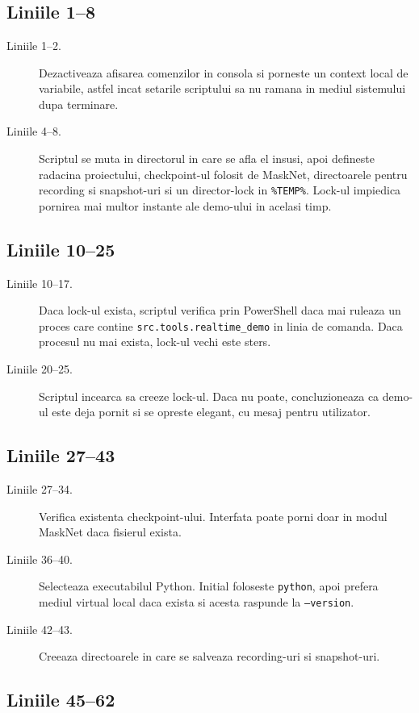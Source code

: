 \documentclass[12pt,a4paper]{report}
\newcommand{\filetitle}[1]{\section*{\texttt{\detokenize{#1}}}}
\newcommand{\cmdchunk}[3]{\subsection*{Liniile #2--#3}}
\begin{document}
\filetitle{launch_realtime_demo.cmd}

\cmdchunk{../launch_realtime_demo.cmd}{1}{8}

\begin{description}
    \item[Liniile 1--2.] Dezactiveaza afisarea comenzilor in consola si porneste
    un context local de variabile, astfel incat setarile scriptului sa nu ramana
    in mediul sistemului dupa terminare.
    \item[Liniile 4--8.] Scriptul se muta in directorul in care se afla el
    insusi, apoi defineste radacina proiectului, checkpoint-ul folosit de
    MaskNet, directoarele pentru recording si snapshot-uri si un director-lock
    in \texttt{\%TEMP\%}. Lock-ul impiedica pornirea mai multor instante ale
    demo-ului in acelasi timp.
\end{description}

\cmdchunk{../launch_realtime_demo.cmd}{10}{25}

\begin{description}
    \item[Liniile 10--17.] Daca lock-ul exista, scriptul verifica prin PowerShell
    daca mai ruleaza un proces care contine \texttt{src.tools.realtime\_demo} in
    linia de comanda. Daca procesul nu mai exista, lock-ul vechi este sters.
    \item[Liniile 20--25.] Scriptul incearca sa creeze lock-ul. Daca nu poate,
    concluzioneaza ca demo-ul este deja pornit si se opreste elegant, cu mesaj
    pentru utilizator.
\end{description}

\cmdchunk{../launch_realtime_demo.cmd}{27}{43}

\begin{description}
    \item[Liniile 27--34.] Verifica existenta checkpoint-ului. Interfata poate
    porni doar in modul MaskNet daca fisierul  exista.
    \item[Liniile 36--40.] Selecteaza executabilul Python. Initial foloseste
    \texttt{python}, apoi prefera mediul virtual local daca exista
     si acesta raspunde la \texttt{--version}.
    \item[Liniile 42--43.] Creeaza directoarele in care se salveaza recording-uri
    si snapshot-uri.
\end{description}

\cmdchunk{../launch_realtime_demo.cmd}{45}{62}
\end{document}
